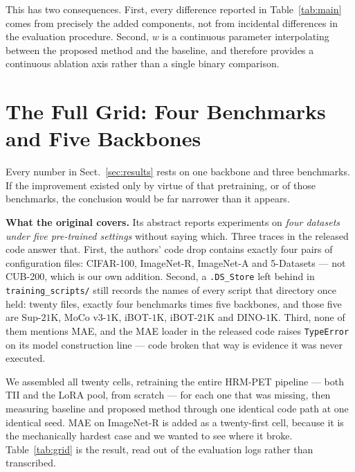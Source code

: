 \documentclass[11pt,a4paper]{article}
\begin{document}
This has two consequences. First, every difference reported in
Table~\ref{tab:main} comes from precisely the added components, not from
incidental differences in the evaluation procedure. Second, $w$ is a continuous
parameter interpolating between the proposed method and the baseline, and
therefore provides a continuous ablation axis rather than a single binary
comparison.

\section{The Full Grid: Four Benchmarks and Five Backbones}
\label{sec:grid}

Every number in Sect.~\ref{sec:results} rests on one backbone and three
benchmarks. If the improvement existed only by virtue of that pretraining, or
of those benchmarks, the conclusion would be far narrower than it appears.

\textbf{What the original covers.} Its abstract reports experiments on
\emph{four datasets under five pre-trained settings} without saying which. Three
traces in the released code answer that. First, the authors' code drop contains
exactly four pairs of configuration files: CIFAR-100, ImageNet-R, ImageNet-A
and 5-Datasets --- not CUB-200, which is our own addition. Second, a
\texttt{.DS\_Store} left behind in \texttt{training\_scripts/} still records the
names of every script that directory once held: twenty files, exactly four
benchmarks times five backbones, and those five are Sup-$21$K, MoCo v3-$1$K,
iBOT-$1$K, iBOT-$21$K and DINO-$1$K. Third, none of them mentions MAE, and the
MAE loader in the released code raises \texttt{TypeError} on its model
construction line --- code broken that way is evidence it was never executed.

We assembled all twenty cells, retraining the entire HRM-PET pipeline --- both
TII and the LoRA pool, from scratch --- for each one that was missing, then
measuring baseline and proposed method through one identical code path at one
identical seed. MAE on ImageNet-R is added as a twenty-first cell, because it
is the mechanically hardest case and we wanted to see where it broke.
Table~\ref{tab:grid} is the result, read out of the evaluation logs rather than
transcribed.
\end{document}
